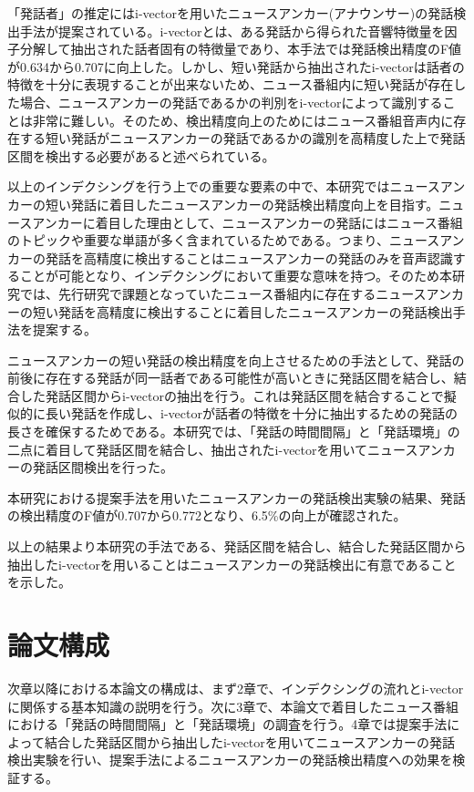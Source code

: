 「発話者」の推定にはi-vectorを用いたニュースアンカー(アナウンサー)の発話検出手法\cite{nozaki_gakuseikai}が提案されている。i-vectorとは、ある発話から得られた音響特徴量を因子分解して抽出された話者固有の特徴量であり、本手法では発話検出精度のF値が0.634から0.707に向上した。しかし、短い発話から抽出されたi-vectorは話者の特徴を十分に表現することが出来ないため\cite{panaiv}、ニュース番組内に短い発話が存在した場合、ニュースアンカーの発話であるかの判別をi-vectorによって識別することは非常に難しい。そのため、検出精度向上のためにはニュース番組音声内に存在する短い発話がニュースアンカーの発話であるかの識別を高精度した上で発話区間を検出する必要があると述べられている。\par

以上のインデクシングを行う上での重要な要素の中で、本研究ではニュースアンカーの短い発話に着目したニュースアンカーの発話検出精度向上を目指す。ニュースアンカーに着目した理由として、ニュースアンカーの発話にはニュース番組のトピックや重要な単語が多く含まれているためである。つまり、ニュースアンカーの発話を高精度に検出することはニュースアンカーの発話のみを音声認識することが可能となり、インデクシングにおいて重要な意味を持つ。そのため本研究では、先行研究\cite{nozaki_gakuseikai}で課題となっていたニュース番組内に存在するニュースアンカーの短い発話を高精度に検出することに着目したニュースアンカーの発話検出手法を提案する。\par

ニュースアンカーの短い発話の検出精度を向上させるための手法として、発話の前後に存在する発話が同一話者である可能性が高いときに発話区間を結合し、結合した発話区間からi-vectorの抽出を行う。これは発話区間を結合することで擬似的に長い発話を作成し、i-vectorが話者の特徴を十分に抽出するための発話の長さを確保するためである。本研究では、「発話の時間間隔」と「発話環境」の二点に着目して発話区間を結合し、抽出されたi-vectorを用いてニュースアンカーの発話区間検出を行った。\par

本研究における提案手法を用いたニュースアンカーの発話検出実験の結果、発話の検出精度のF値が0.707から0.772となり、6.5\%の向上が確認された。\par

以上の結果より本研究の手法である、発話区間を結合し、結合した発話区間から抽出したi-vectorを用いることはニュースアンカーの発話検出に有意であることを示した。

\section{論文構成}
次章以降における本論文の構成は、まず2章で、インデクシングの流れとi-vectorに関係する基本知識の説明を行う。次に3章で、本論文で着目したニュース番組における「発話の時間間隔」と「発話環境」の調査を行う。4章では提案手法によって結合した発話区間から抽出したi-vectorを用いてニュースアンカーの発話検出実験を行い、提案手法によるニュースアンカーの発話検出精度への効果を検証する。

